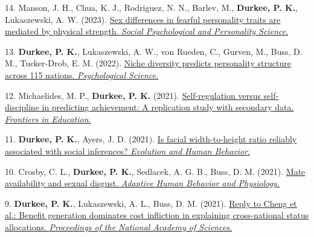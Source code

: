 \documentclass[10pt,]{article}
\begin{document}
14.\hangindent=0.5in
\marginpar{\scriptsize{\faLightbulbO\faTable\faBarChart\faPencil}}
\marginpar{\textsuperscript{\faDatabase\faFileCodeO}} Manson, J. H.,
Chua, K. J., Rodriguez, N. N., Barlev, M., \textbf{Durkee, P. K.},
Lukaszewski, A. W. (2023).
\href{http://www.pdurkee.com/files/pubs/Mansonetal_2022.pdf}{Sex
differences in fearful personality traits are mediated by physical
strength. \emph{Social Psychological and Personality Science}.}

13.\hangindent=0.5in
\marginpar{\scriptsize{\faLightbulbO\faTable\faBarChart\faPencil}}
\marginpar{\textsuperscript{\faDatabase\faFileCodeO}} \textbf{Durkee, P.
K.}, Lukaszewski, A. W., von Rueden, C., Gurven, M., Buss, D. M.,
Tucker-Drob, E. M. (2022).
\href{http://www.pdurkee.com/files/pubs/Durkee_etal_2022_PsychScience.pdf}{Niche
diversity predicts personality structure across 115 nations.
\emph{Psychological Science}.}

12.\hangindent=0.5in \marginpar{\scriptsize{\faBarChart\faPencil}}
\marginpar{\textsuperscript{\faRegistered\faDatabase\faFileCodeO}}
Michaelides, M. P., \textbf{Durkee, P. K.} (2021).
\href{http://www.pdurkee.com/files/pubs/Michaelides&Durkee.pdf}{Self-regulation
versus self-discipline in predicting achievement: A replication study
with secondary data. \emph{Frontiers in Education}.}

11.\hangindent=0.5in
\marginpar{\scriptsize{\faLightbulbO\faBarChart\faPencil}}
\marginpar{\textsuperscript{\faRegistered\faDatabase\faFileCodeO}}
\textbf{Durkee, P. K.}, Ayers, J. D. (2021).
\href{http://www.pdurkee.com/files/pubs/Durkee&Ayers2021_fWHR_EHB.pdf}{Is
facial width-to-height ratio reliably associated with social inferences?
\emph{Evolution and Human Behavior}.}

10.\hangindent=0.5in
\marginpar{\scriptsize{\faLightbulbO\faTable\faBarChart\faPencil}}
\marginpar{\textsuperscript{\faRegistered\faDatabase\faFileCodeO}}
Crosby, C. L.\textsuperscript{\faUnsorted}, \textbf{Durkee, P.
K.}\textsuperscript{\faUnsorted}, Sedlacek, A. G. B., Buss, D. M.
(2021).
\href{http://www.pdurkee.com/files/pubs/Crosby_et_al-2021-Adaptive_Human_Behavior_and_Physiology.pdf}{Mate
availability and sexual disgust. \emph{Adaptive Human Behavior and
Physiology.}}

9.\hangindent=0.5in \marginpar{\scriptsize{\faBarChart\faPencil}}
\marginpar{\textsuperscript{\faDatabase\faFileCodeO}} \textbf{Durkee, P.
K.}, Lukaszewski, A. L., Buss, D. M. (2021).
\href{http://www.pdurkee.com/files/pubs/DurkeeReply_2021.pdf}{Reply to
Cheng et al.: Benefit generation dominates cost infliction in explaining
cross-national status allocations. \emph{Proceedings of the National
Academy of Sciences}.}
\end{document}
